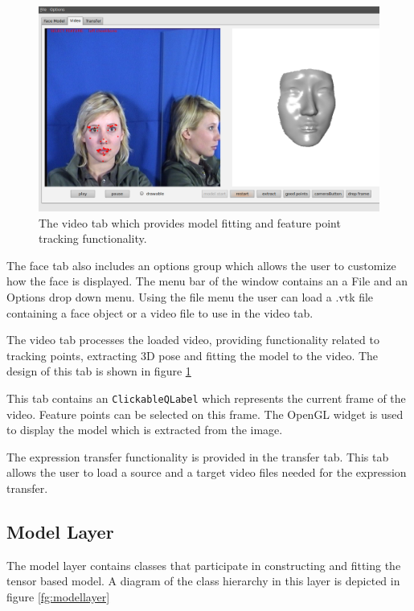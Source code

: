 \documentclass[11pt,a4paper]{report}
\begin{document}
\begin{figure}[H]
\begin{centering}
\includegraphics[scale=0.35]{images/videotab.png}
\par\end{centering}

\caption{The video tab which provides model fitting and feature point tracking functionality.}
\label{fg:videotab}
\end{figure}

The face tab also includes an options group which allows the user to customize how
the face is displayed. The menu bar of the window contains an a File and an
Options drop down menu. Using the file menu the user can load a .vtk file
containing a face object or a video file to use in the video tab.

The video tab processes the loaded video, providing functionality related to tracking points, extracting 3D
pose and fitting the model to the video. The design of this tab is shown in
figure \ref{fg:videotab} 


This tab contains an \texttt{ClickableQLabel} which represents the current frame
of the video. Feature points can be selected on this frame. The 
OpenGL widget is used to display the model which is extracted from the image.

The expression transfer functionality is provided in the transfer tab. This tab allows the user to load a
source and a target video files needed for the expression transfer.

\subsection{Model Layer}
The model layer contains classes that participate in constructing and fitting
the tensor based model. A diagram of the class hierarchy in this layer is
depicted in figure \ref{fg:modellayer}
\end{document}
